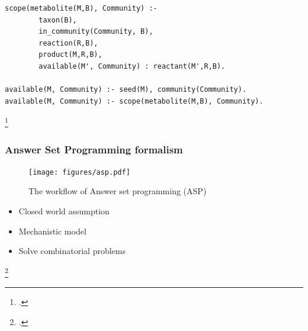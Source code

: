\documentclass[8pt,usenames,dvipsnames]{beamer}
\begin{document}
\begin{frame}[fragile]
\begin{onlyenv}
\begin{minipage}{0.55\textwidth}
\begin{lstlisting}[style=asp]
scope(metabolite(M,B), Community) :-
		taxon(B),
		in_community(Community, B),
		reaction(R,B),
		product(M,R,B),
		available(M', Community) : reactant(M',R,B).

available(M, Community) :- seed(M), community(Community).
available(M, Community) :- scope(metabolite(M,B), Community).

\end{lstlisting}
\end{minipage}
\end{onlyenv}

\footcite{Ebenhoh2004}

\end{frame}

\begin{frame}
\frametitle{Answer Set Programming formalism}
\centering
\begin{figure}[h]
\texttt{[image: figures/asp.pdf]}
\caption{The workflow of Answer set programming (ASP)}
\end{figure}
\begin{block}{}
\begin{itemize}
\item Closed world assumption
\item Mechanistic model
\item Solve combinatorial problems
\end{itemize}

\end{block}
\footcite{Kaufmann2016GroundingAS}
\end{frame}
\end{document}
